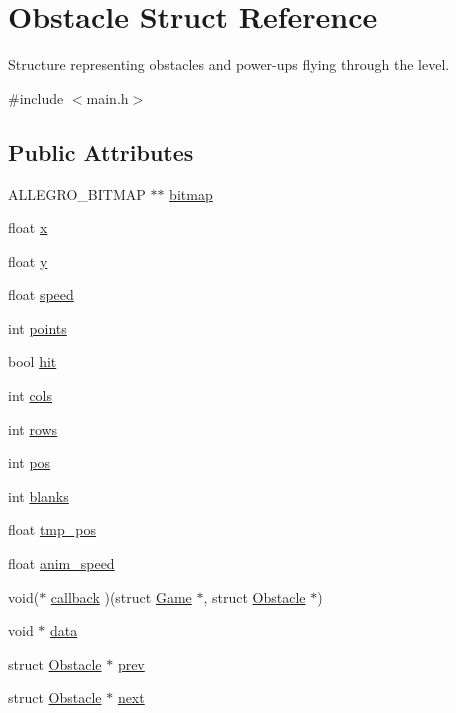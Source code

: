 \hypertarget{structObstacle}{\section{\-Obstacle \-Struct \-Reference}
\label{structObstacle}
}


\-Structure representing obstacles and power-\/ups flying through the level.  




{\ttfamily \#include $<$main.\-h$>$}

\subsection*{\-Public \-Attributes}
\begin{DoxyCompactItemize}
\item 
\-A\-L\-L\-E\-G\-R\-O\-\_\-\-B\-I\-T\-M\-A\-P $\ast$$\ast$ \hyperlink{structObstacle_a1f35f88fe8f6d0664da082f82ae4b774}{bitmap}
\item 
float \hyperlink{structObstacle_ad9cd25e0032f6692a4f93a057ccdfd85}{x}
\item 
float \hyperlink{structObstacle_af4b6f012014e2fa5aef193330f70fdef}{y}
\item 
float \hyperlink{structObstacle_a1e2b46db05325273ce0fcba3550b5b2a}{speed}
\item 
int \hyperlink{structObstacle_a38a164a0e4d6f6508fb65c6eff39147f}{points}
\item 
bool \hyperlink{structObstacle_ac89d025f4ad7c2f083d262c1bee4e851}{hit}
\item 
int \hyperlink{structObstacle_ad51aa07361c732a47e78c80fae2fab7c}{cols}
\item 
int \hyperlink{structObstacle_aab33c9d4c0f05d02fda4e77cff7d7e72}{rows}
\item 
int \hyperlink{structObstacle_a5228dff4dc773a66043e822fb4d6d00c}{pos}
\item 
int \hyperlink{structObstacle_a862f4038bd63057d91406720bb586a9c}{blanks}
\item 
float \hyperlink{structObstacle_afd620c4c3496cd6f84184dcda4ca7611}{tmp\-\_\-pos}
\item 
float \hyperlink{structObstacle_a96a13e4704e4643291989193a112366a}{anim\-\_\-speed}
\item 
void($\ast$ \hyperlink{structObstacle_a21b4ff0edaa2dc5394ff7a6328e48358}{callback} )(struct \hyperlink{structGame}{\-Game} $\ast$, struct \hyperlink{structObstacle}{\-Obstacle} $\ast$)
\item 
void $\ast$ \hyperlink{structObstacle_a88728e624cc62993e2bf52aff816cdff}{data}
\item 
struct \hyperlink{structObstacle}{\-Obstacle} $\ast$ \hyperlink{structObstacle_a13bc07b730f58d5b1c3db68e8e4aca27}{prev}
\item 
struct \hyperlink{structObstacle}{\-Obstacle} $\ast$ \hyperlink{structObstacle_aedbcf65351fa59ca9f18f6fba0287dc1}{next}
\end{DoxyCompactItemize}


